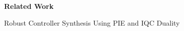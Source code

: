 \documentclass[11pt,a4paper]{article}
\begin{document}
\begin{center}
  {\Large\bfseries Related Work}\par\vspace{0.5em}
  {\large Robust Controller Synthesis Using PIE and IQC Duality}
\end{center}
\vspace{0.5em}



\clearpage


\end{document}
